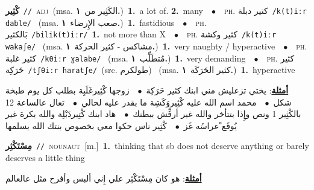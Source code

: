 \documentclass[10pt,a4paper,twoside]{article} %
\begin{document}
\begin{multicols}{2}
{\setlength\topsep{0pt}\textbf{\foreignlanguage{arabic}{كْثِير}}\ {\color{gray}\texttt{//}\color{black}}\ \textsc{adj}\ \color{gray}(msa. \foreignlanguage{arabic}{الكَثِير من}~\foreignlanguage{arabic}{\textbf{١.}})\color{black}\ \textbf{1.}~a lot of.  \textbf{2.}~many\ \ $\bullet$\ \ \textsc{ph.} \color{gray} \foreignlanguage{arabic}{كتير دبلة}\color{black}\ {\color{gray}\texttt{/{\sffamily k(t)iːr dable}/}\color{black}}\ \color{gray} (msa. \foreignlanguage{arabic}{صعب الإِرضاء}~\foreignlanguage{arabic}{\textbf{١.}})\color{black}\ \textbf{1.}~fastidious\ \ $\bullet$\ \ \textsc{ph.} \color{gray} \foreignlanguage{arabic}{بَالكثير}\color{black}\ {\color{gray}\texttt{/{\sffamily bilik(t)iːr}/}\color{black}}\ \textbf{1.}~not more than X\ \ $\bullet$\ \ \textsc{ph.} \color{gray} \foreignlanguage{arabic}{كثير وكشة}\color{black}\ {\color{gray}\texttt{/{\sffamily k(t)iːr wakaʃe}/}\color{black}}\ \color{gray} (msa. \foreignlanguage{arabic}{مشاكس - كثير الحركة}~\foreignlanguage{arabic}{\textbf{١.}})\color{black}\ \textbf{1.}~very naughty / hyperactive\ \ $\bullet$\ \ \textsc{ph.} \color{gray} \foreignlanguage{arabic}{كثير غلبة}\color{black}\ {\color{gray}\texttt{/{\sffamily kθiːr ɣalabe}/}\color{black}}\ \color{gray} (msa. \foreignlanguage{arabic}{مُتطَلِّب}~\foreignlanguage{arabic}{\textbf{١.}})\color{black}\ \textbf{1.}~very demanding\ \ $\bullet$\ \ \textsc{ph.} \color{gray} \foreignlanguage{arabic}{كثير حَرَكِة}\color{black}\ {\color{gray}\texttt{/{\sffamily tʃθiːr ħaratʃe}/}\color{black}}\ \color{gray}(src. \foreignlanguage{arabic}{طولكرم})\color{black}\ \color{gray} (msa. \foreignlanguage{arabic}{كثير الحَرَكَة}~\foreignlanguage{arabic}{\textbf{١.}})\color{black}\ \textbf{1.}~hyperactive\  \begin{flushright}\color{gray}\foreignlanguage{arabic}{\textbf{\underline{\foreignlanguage{arabic}{أمثلة}}}: يختي تزعليش مني ابنك كثير حَرَكِة\ $\bullet$\ \  زوجها كْثِيرغَلَبِة بطلب كل يوم طبخة شكل\ $\bullet$\ \  محمد اسم الله عليه كْثِيروَكَشِة ما بقدر عليه لحالي\ $\bullet$\ \  تعال عالساعة 12 بالكْثِير 1 ونص وإِذا بتتأخر والله غير أرفِّش ببطنك\ $\bullet$\ \  هاد ابنك كْتِيردَبْلِة والله بكرة غير يُوقَع ْعراسُه غَز\ $\bullet$\ \  كْثِير ناس حكوا معي بخصوص بنتك الله يسلمها}\end{flushright}\color{black}} \vspace{2mm}

{\setlength\topsep{0pt}\textbf{\foreignlanguage{arabic}{مِسْتَكْثِر}}\ {\color{gray}\texttt{//}\color{black}}\ \textsc{noun\textunderscore act}\ [m.]\ \textbf{1.}~thinking that sb does not deserve anything or barely deserves a little thing\  \begin{flushright}\color{gray}\foreignlanguage{arabic}{\textbf{\underline{\foreignlanguage{arabic}{أمثلة}}}: هو كان مِسْتَكْثِر علي إِني ألبس وأفرح مثل عالعالم}\end{flushright}\color{black}} \vspace{2mm}


\end{multicols}
\end{document}
